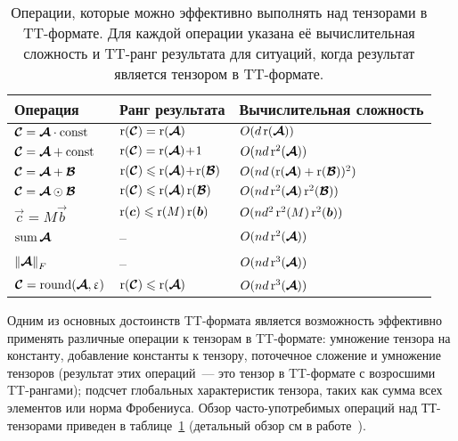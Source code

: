 \begin{table}[t]
\caption{Операции, которые можно эффективно выполнять над тензорами в TT\hyp{}формате. Для каждой операции указана её вычислительная сложность и TT\hyp{}ранг результата для ситуаций, когда результат является тензором в TT\hyp{}формате.}
\label{TT-tensor-operations}
\vskip 0.05in
\begin{center}
\begin{small}
\begin{tabular}{l@{\;\;}l@{\;\;}l}
\hline
Операция & Ранг результата & Вычислительная сложность \\
\hline
$\boldsymbol{\mathcal{C}} = \boldsymbol{\mathcal{A}} \cdot \operatorname{const}$      & $\operatorname{r}(\boldsymbol{\mathcal{C}}) = \operatorname{r}(\boldsymbol{\mathcal{A}})$             & $O(d  \operatorname{r}(\boldsymbol{\mathcal{A}}))$\\
$\boldsymbol{\mathcal{C}} = \boldsymbol{\mathcal{A}} + \operatorname{const}$          & $\operatorname{r}(\boldsymbol{\mathcal{C}}) = \operatorname{r}(\boldsymbol{\mathcal{A}})\!+\!1$         & $O(n  d  \operatorname{r}^2(\boldsymbol{\mathcal{A}}))$\\
$\boldsymbol{\mathcal{C}} = \boldsymbol{\mathcal{A}} + \boldsymbol{\mathcal{B}}$           & $\operatorname{r}(\boldsymbol{\mathcal{C}}) \leqslant \operatorname{r}(\boldsymbol{\mathcal{A}})\!+\!\operatorname{r}(\boldsymbol{\mathcal{B}})$       & $O(n  d \, (\operatorname{r}(\boldsymbol{\mathcal{A}}) + \operatorname{r}(\boldsymbol{\mathcal{B}}))^2)$\\
$\boldsymbol{\mathcal{C}} = \boldsymbol{\mathcal{A}} \odot \boldsymbol{\mathcal{B}}$       & $\operatorname{r}(\boldsymbol{\mathcal{C}}) \leqslant \operatorname{r}(\boldsymbol{\mathcal{A}})  \operatorname{r}(\boldsymbol{\mathcal{B}})$   & $O(n  d  \operatorname{r}^2(\boldsymbol{\mathcal{A}})  \operatorname{r}^2(\boldsymbol{\mathcal{B}}))$\\
$\vec{c}=M\vec{b}$                          & $\operatorname{r}(\boldsymbol{c}) \leqslant \operatorname{r}(M) \operatorname{r}(\boldsymbol{b})$       & $O(n d^2 \operatorname{r}^2(M) \operatorname{r}^2(\boldsymbol{b}))$\\
$\operatorname{sum} \boldsymbol{\mathcal{A}}$                & --                      & $O(n  d  \operatorname{r}^2(\boldsymbol{\mathcal{A}}))$\\
$\left \| \boldsymbol{\mathcal{A}} \right \|_F$       & --                      & $O(n  d  \operatorname{r}^3(\boldsymbol{\mathcal{A}}))$\\
$\boldsymbol{\mathcal{C}} = \operatorname{round}(\boldsymbol{\mathcal{A}}, \upvarepsilon)$ & $\operatorname{r}(\boldsymbol{\mathcal{C}}) \leqslant \operatorname{r}(\boldsymbol{\mathcal{A}})$          & $O(n d \operatorname{r}^3(\boldsymbol{\mathcal{A}}))$\\
\hline
\end{tabular}
\end{small}
\end{center}
\vskip -0.1in
\end{table}

Одним из основных достоинств TT\hyp{}формата является возможность эффективно применять различные операции к тензорам в TT\hyp{}формате:
умножение тензора на константу, добавление константы к тензору, поточечное сложение и умножение тензоров (результат этих операций~--- это тензор в TT\hyp{}формате с возросшими TT\hyp{}рангами); подсчет глобальных характеристик тензора, таких как сумма всех элементов или норма Фробениуса. Обзор часто-употребимых операций над ТТ-тензорами приведен в таблице~\ref{TT-tensor-operations} (детальный обзор см в работе~\cite{oseledets2011ttMain}).

